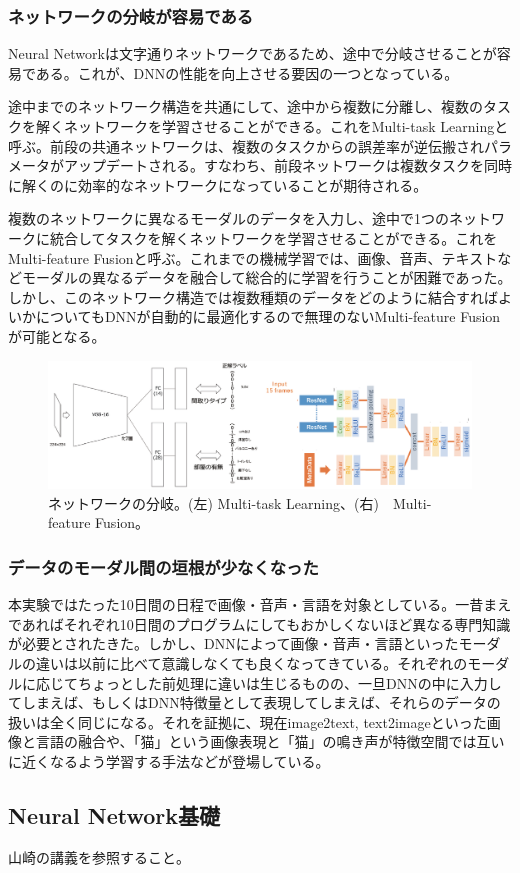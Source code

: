 \subsubsection{ネットワークの分岐が容易である}
Neural Networkは文字通りネットワークであるため、途中で分岐させることが容易である。これが、DNNの性能を向上させる要因の一つとなっている。

途中までのネットワーク構造を共通にして、途中から複数に分離し、複数のタスクを解くネットワークを学習させることができる。これをMulti-task Learningと呼ぶ。前段の共通ネットワークは、複数のタスクからの誤差率が逆伝搬されパラメータがアップデートされる。すなわち、前段ネットワークは複数タスクを同時に解くのに効率的なネットワークになっていることが期待される。

複数のネットワークに異なるモーダルのデータを入力し、途中で1つのネットワークに統合してタスクを解くネットワークを学習させることができる。これをMulti-feature Fusionと呼ぶ。これまでの機械学習では、画像、音声、テキストなどモーダルの異なるデータを融合して総合的に学習を行うことが困難であった。しかし、このネットワーク構造では複数種類のデータをどのように結合すればよいかについてもDNNが自動的に最適化するので無理のないMulti-feature Fusionが可能となる。

\begin{figure}[ht]
	\begin{center}
		\includegraphics[width=0.7\linewidth] {images/YamasakiLab/introduction/branch.eps}
		\caption{ネットワークの分岐。(左) Multi-task Learning、(右)　Multi-feature Fusion。}
		\label{fig:accuracy}
	\end{center}
\end{figure}

\subsubsection{データのモーダル間の垣根が少なくなった}
本実験ではたった10日間の日程で画像・音声・言語を対象としている。一昔まえであればそれぞれ10日間のプログラムにしてもおかしくないほど異なる専門知識が必要とされたきた。しかし、DNNによって画像・音声・言語といったモーダルの違いは以前に比べて意識しなくても良くなってきている。それぞれのモーダルに応じてちょっとした前処理に違いは生じるものの、一旦DNNの中に入力してしまえば、もしくはDNN特徴量として表現してしまえば、それらのデータの扱いは全く同じになる。それを証拠に、現在image2text, text2imageといった画像と言語の融合や、「猫」という画像表現と「猫」の鳴き声が特徴空間では互いに近くなるよう学習する手法などが登場している。

\subsection{Neural Network基礎}
山崎の講義を参照すること。


